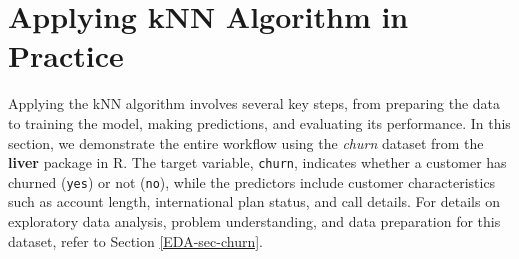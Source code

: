 \documentclass[
  11pt,
]{book}
\theoremstyle{definition}
\theoremstyle{definition}
\theoremstyle{definition}
\theoremstyle{definition}
\theoremstyle{remark}
\begin{document}
\section{Applying kNN Algorithm in Practice}\label{sec-kNN-churn}

Applying the kNN algorithm involves several key steps, from preparing the data to training the model, making predictions, and evaluating its performance. In this section, we demonstrate the entire workflow using the \emph{churn} dataset from the \textbf{liver} package in R. The target variable, \texttt{churn}, indicates whether a customer has churned (\texttt{yes}) or not (\texttt{no}), while the predictors include customer characteristics such as account length, international plan status, and call details. For details on exploratory data analysis, problem understanding, and data preparation for this dataset, refer to Section \ref{EDA-sec-churn}.
\end{document}
